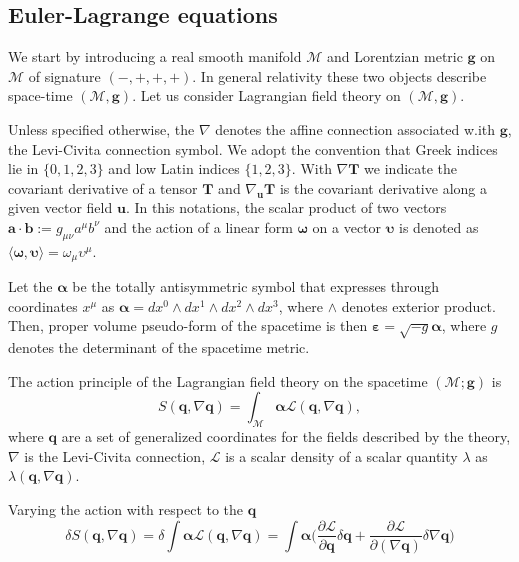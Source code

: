 \documentclass[11pt,a4paper,headinclude=true,DIV=14,BCOR=8mm,chapterprefix,listof=totoc,twoside,openright,abstracton]{scrbook}
\begin{document}

\subsection{Euler-Lagrange equations}

We start by introducing a real smooth manifold $\mathcal{M}$ and Lorentzian metric $\boldsymbol{g}$ on $\mathcal{M}$ of signature $(-,+,+,+)$. In general relativity these two objects describe space-time $(\mathcal{M},\boldsymbol{g})$. Let us consider Lagrangian field theory on $(\mathcal{M},\boldsymbol{g})$.

Unless specified otherwise, the $\nabla$ denotes the affine connection associated w.ith $\boldsymbol{g}$, the Levi-Civita connection symbol. We adopt the convention that Greek indices lie in $\{0, 1, 2, 3\}$ and low Latin indices $\{1, 2, 3\}$. With $\nabla\boldsymbol{T}$ we indicate the covariant derivative of a tensor $\boldsymbol{T}$ and $\nabla_{\boldsymbol{u}}\boldsymbol{T}$ is the covariant derivative along a given vector field $\boldsymbol{u}$. In this notations, the scalar product of two vectors $\boldsymbol{a}\cdot\boldsymbol{b}:=g_{\mu\nu}a^{\mu}b^{\nu}$ and the action of a linear form $\boldsymbol{\omega}$ on a vector $\boldsymbol{\upsilon}$ is denoted as $\langle\boldsymbol{\omega},\boldsymbol{\upsilon}\rangle=\omega_{\mu}\upsilon^{\mu}$.

Let the $\boldsymbol{\alpha}$ be the totally antisymmetric symbol that expresses through coordinates $x^{\mu}$ as $\boldsymbol{\alpha} = dx^0 \wedge dx^1 \wedge dx^2 \wedge dx^3$, where $\wedge$ denotes exterior product. Then, proper volume pseudo-form of the spacetime is then $\boldsymbol{\varepsilon} = \sqrt{-g}\boldsymbol{\alpha}$, where $g$ denotes the determinant of the spacetime metric.

The action principle of the Lagrangian field theory on the spacetime $(\mathcal{M}; \boldsymbol{g})$ is
\begin{equation}
S(\boldsymbol{q}, \nabla\boldsymbol{q}) = \int_{\mathcal{M}}\boldsymbol{\alpha}\mathcal{L}(\boldsymbol{q}, \nabla\boldsymbol{q}),
\end{equation}
where $\boldsymbol{q}$ are a set of generalized coordinates for the fields described by the theory, $\nabla$ is the Levi-Civita connection, $\mathcal{L}$ is a scalar density of a scalar quantity $\lambda$ as $\lambda(\boldsymbol{q},\nabla\boldsymbol{q})$. 

Varying the action with respect to the $\boldsymbol{q}$
\begin{equation}
\delta S(\boldsymbol{q}, \nabla\boldsymbol{q}) = \delta\int\boldsymbol{\alpha}\mathcal{L}(\boldsymbol{q}, \nabla\boldsymbol{q}) = \int\boldsymbol{\alpha}\Big(\frac{\partial\mathcal{L}}{\partial\boldsymbol{q}}\delta\boldsymbol{q}+\frac{\partial\mathcal{L}}{\partial(\nabla\boldsymbol{q})}\delta\nabla\boldsymbol{q}\Big)
\end{equation}
\end{document}
